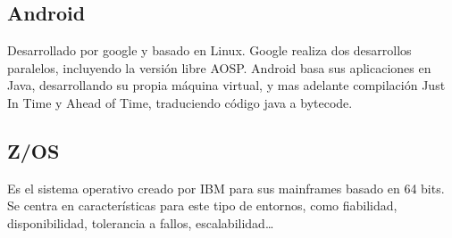 \subsection{Android}
    Desarrollado por google y basado en Linux. Google realiza dos desarrollos paralelos, incluyendo la versión libre AOSP. Android basa sus aplicaciones en Java, desarrollando su propia máquina virtual, y mas adelante compilación Just In Time y Ahead of Time, traduciendo código java a bytecode.

\subsection{Z/OS}
    Es el sistema operativo creado por IBM para sus mainframes basado en 64 bits. Se centra en características para este tipo de entornos, como fiabilidad, disponibilidad, tolerancia a fallos, escalabilidad\dots